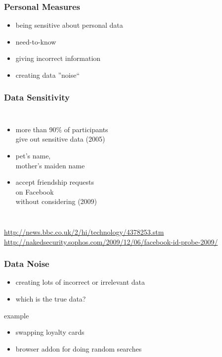 \documentclass[dvipsnames]{beamer}
\theoremstyle{plain}
\begin{document}
\begin{frame}
  \frametitle{Personal Measures}

  \begin{itemize}
    \item being sensitive about personal data
    \item need-to-know

    \pause
    \bigskip
    \item giving incorrect information
    \item creating data ''noise``
  \end{itemize}
\end{frame}

\begin{frame}
  \frametitle{Data Sensitivity}

  \begin{columns}

    \begin{itemize}
      \item more than 90\% of participants\\
        give out sensitive data (2005)
      \item pet's name,\\
        mother's maiden name

      \bigskip
      \item accept friendship requests\\
        on Facebook\\
        without considering (2009)
    \end{itemize}
  \end{columns}

  \medskip
  \tiny{\url{http://news.bbc.co.uk/2/hi/technology/4378253.stm}}\\
  \smallskip
  \tiny{\url{http://nakedsecurity.sophos.com/2009/12/06/facebook-id-probe-2009/}}\\
\end{frame}

\begin{frame}
  \frametitle{Data Noise}

  \begin{itemize}
    \item creating lots of incorrect or irrelevant data
    \item which is the true data?
  \end{itemize}

  \begin{exampleblock}{example}
    \begin{itemize}
      \item swapping loyalty cards
      \item browser addon for doing random searches
    \end{itemize}
  \end{exampleblock}
\end{frame}
\end{document}
